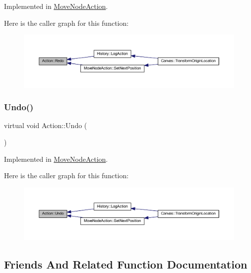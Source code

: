 Implemented in \hyperlink{class_move_node_action_ae73d7a16920641dcc5b83f671e287223}{Move\+Node\+Action}.

Here is the caller graph for this function\+:
\nopagebreak
\begin{figure}[H]
\begin{center}
\leavevmode
\includegraphics[width=350pt]{class_action_a69864cea344385ee84a5120eaab5d82a_icgraph}
\end{center}
\end{figure}
\mbox{\label{class_action_aab28a6693a01e51712ccbf4d24b6015e}} 
\subsubsection{\texorpdfstring{Undo()}{Undo()}}
{\footnotesize\ttfamily virtual void Action\+::\+Undo (\begin{DoxyParamCaption}{ }\end{DoxyParamCaption})\hspace{0.3cm}{\ttfamily [pure virtual]}}



Implemented in \hyperlink{class_move_node_action_ad2136c2037da52ba1417c0c44b28d579}{Move\+Node\+Action}.

Here is the caller graph for this function\+:
\nopagebreak
\begin{figure}[H]
\begin{center}
\leavevmode
\includegraphics[width=350pt]{class_action_aab28a6693a01e51712ccbf4d24b6015e_icgraph}
\end{center}
\end{figure}


\subsection{Friends And Related Function Documentation}
\mbox{\label{class_action_a12790c6b4f2fb95ff77fbfec4dd07867}} 
